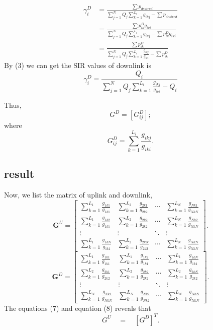 \documentclass[12pt]{article}
\begin{document}
\begin{align*}
\gamma_i^D&=\frac{\sum p_{desired} }{\sum\limits_{j=1}^N Q_j \sum\limits_{k=1}^{L_i} g_{ikj}-\sum p_{desired}}\\   
&=\frac{\sum p_{ik}^D g_{iki} } {\sum\limits_{j=1}^N Q_j \sum\limits_{k=1}^{L_i} g_{ikj}-\sum p_{ik}^D g_{iki}}\\
&=\frac{\sum p_{ik}^D  } {\sum\limits_{j=1}^N Q_j \sum\limits_{k=1}^{L_i} \frac{g_{ikj}}{g_{iki}}-\sum p_{ik}^D}
\end{align*}
By (3) we can get the SIR values of downlink is \begin{equation}
\gamma_i^D=\frac{Q_i  } {\sum\limits_{j=1}^N Q_j \sum\limits_{k=1}^{L_i} \frac{g_{ikj}}{g_{iki}}-Q_i}
\end{equation}

Thus,  \begin{equation*}
G^D=[G_{ij}^D];
\end{equation*}
where \begin{equation}
G_{ij}^D = \sum^{L_i}_{k=1} \frac{g_{ikj}}{g_{iki}}.
\end{equation}

\subsection{result}

Now, we list the matrix of uplink and downlink,
\begin{equation}
\bm G^U = \left[ \begin{matrix}
\sum\limits_{k=1}^{L_1}\frac{g_{1k1}}{g_{1k1}}&\sum\limits_{k=1}^{L_2}\frac{g_{2k1}}{g_{2k2}}&\cdots&\sum\limits_{k=1}^{L_N}\frac{g_{Nk1}}{g_{NkN}}\\
\sum\limits_{k=1}^{L_1}\frac{g_{1k2}}{g_{1k1}}&\sum\limits_{k=1}^{L_2}\frac{g_{2k2}}{g_{2k2}}&\cdots&\sum\limits_{k=1}^{L_N}\frac{g_{Nk2}}{g_{NkN}}\\
\vdots&\vdots&\ddots&\vdots\\
\sum\limits_{k=1}^{L_1}\frac{g_{1kN}}{g_{1k1}}&\sum\limits_{k=1}^{L_2}\frac{g_{2kN}}{g_{2k2}}&\cdots&\sum\limits_{k=1}^{L_N}\frac{g_{NkN}}{g_{NkN}}
\end{matrix}\right]. 
\end{equation}
\begin{equation}
\bm G^D = \left[ \begin{matrix}
\sum\limits_{k=1}^{L_1}\frac{g_{1k1}}{g_{1k1}}&\sum\limits_{k=1}^{L_1}\frac{g_{1k2}}{g_{1k1}}&\cdots&\sum\limits_{k=1}^{L_1}\frac{g_{1kN}}{g_{1k1}}\\
\sum\limits_{k=1}^{L_2}\frac{g_{2k1}}{g_{2k2}}&\sum\limits_{k=1}^{L_2}\frac{g_{2k2}}{g_{2k2}}&\cdots&\sum\limits_{k=1}^{L_2}\frac{g_{2kN}}{g_{2k2}}\\
\vdots&\vdots&\ddots&\vdots\\
\sum\limits_{k=1}^{L_N}\frac{g_{Nk1}}{g_{NkN}}&\sum\limits_{k=1}^{L_N}\frac{g_{Nk2}}{g_{Nk2}}&\cdots&\sum\limits_{k=1}^{L_N}\frac{g_{NkN}}{g_{NkN}}
\end{matrix}\right]. 
\end{equation}
The equations (7) and equation (8) reveals that 
\begin{equation*}
G^U\quad=\quad\left[G^D\right]^T.
\end{equation*}
\end{document}
